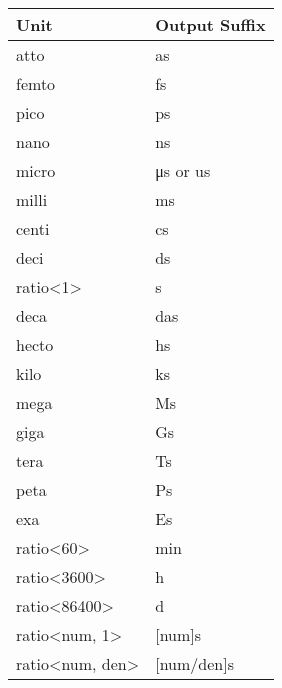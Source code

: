 \begin{longtable}[c]{|l|l|}
\hline
\textbf{Unit}                          & \textbf{Output Suffix} \\ \hline
\endfirsthead
%
\endhead
%
atto                                   & as                     \\ \hline
femto                                  & fs                     \\ \hline
pico                                   & ps                     \\ \hline
nano                                   & ns                     \\ \hline
micro                                  & μs or us               \\ \hline
milli                                  & ms                     \\ \hline
centi                                  & cs                     \\ \hline
deci                                   & ds                     \\ \hline
ratio\textless{}1\textgreater{}        & s                      \\ \hline
deca                                   & das                    \\ \hline
hecto                                  & hs                     \\ \hline
kilo                                   & ks                     \\ \hline
mega                                   & Ms                     \\ \hline
giga                                   & Gs                     \\ \hline
tera                                   & Ts                     \\ \hline
peta                                   & Ps                     \\ \hline
exa                                    & Es                     \\ \hline
ratio\textless{}60\textgreater{}       & min                    \\ \hline
ratio\textless{}3600\textgreater{}     & h                      \\ \hline
ratio\textless{}86400\textgreater{}    & d                      \\ \hline
ratio\textless{}num, 1\textgreater{}   & {[}num{]}s             \\ \hline
ratio\textless{}num, den\textgreater{} & {[}num/den{]}s         \\ \hline
\end{longtable}

